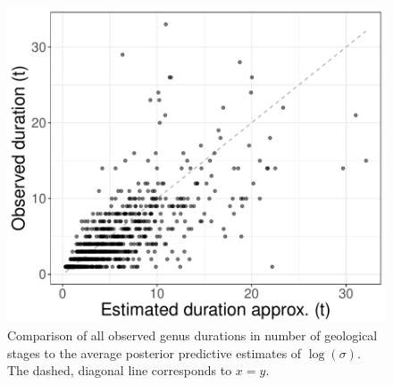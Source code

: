\documentclass[11pt]{article}
\begin{document}
\begin{figure}[ht]
  \centering
  \includegraphics[height = 0.5\textheight,width=\textwidth,keepaspectratio=true]{figure/shotgun_cweib_base}
  \caption{Comparison of all observed genus durations in number of geological stages to the average posterior predictive estimates of \(\log(\sigma)\). The dashed, diagonal line corresponds to \(x = y\).}
  \label{fig:shot}
\end{figure}
\end{document}
